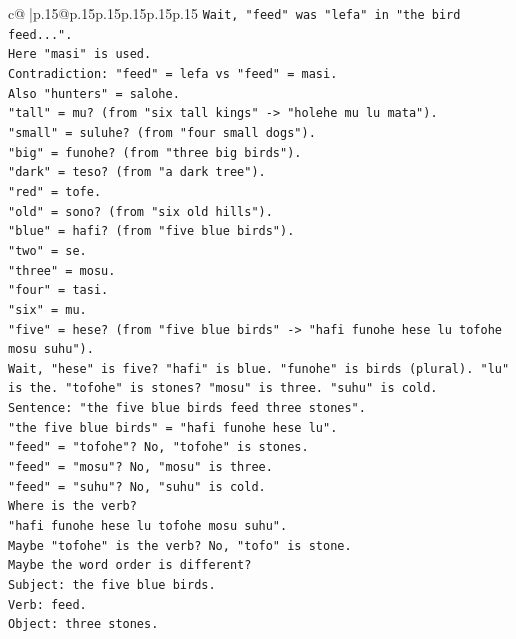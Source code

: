 \documentclass{article}
\begin{document}
{\begin{supertabular}{c@{$\;$}|p{.15\linewidth}@{}p{.15\linewidth}p{.15\linewidth}p{.15\linewidth}p{.15\linewidth}p{.15\linewidth}}
{{{\texttt{Wait, "feed" was "lefa" in "the bird feed...".} \\
\texttt{Here "masi" is used.} \\
\texttt{Contradiction: "feed" = lefa vs "feed" = masi.} \\
\texttt{Also "hunters" = salohe.} \\
\texttt{"tall" = mu? (from "six tall kings" {-}> "holehe mu lu mata").} \\
\texttt{"small" = suluhe? (from "four small dogs").} \\
\texttt{"big" = funohe? (from "three big birds").} \\
\texttt{"dark" = teso? (from "a dark tree").} \\
\texttt{"red" = tofe.} \\
\texttt{"old" = sono? (from "six old hills").} \\
\texttt{"blue" = hafi? (from "five blue birds").} \\
\texttt{"two" = se.} \\
\texttt{"three" = mosu.} \\
\texttt{"four" = tasi.} \\
\texttt{"six" = mu.} \\
\texttt{"five" = hese? (from "five blue birds" {-}> "hafi funohe hese lu tofohe mosu suhu").} \\
\texttt{Wait, "hese" is five? "hafi" is blue. "funohe" is birds (plural). "lu" is the. "tofohe" is stones? "mosu" is three. "suhu" is cold.} \\
\texttt{Sentence: "the five blue birds feed three stones".} \\
\texttt{"the five blue birds" = "hafi funohe hese lu".} \\
\texttt{"feed" = "tofohe"? No, "tofohe" is stones.} \\
\texttt{"feed" = "mosu"? No, "mosu" is three.} \\
\texttt{"feed" = "suhu"? No, "suhu" is cold.} \\
\texttt{Where is the verb?} \\
\texttt{"hafi funohe hese lu tofohe mosu suhu".} \\
\texttt{Maybe "tofohe" is the verb? No, "tofo" is stone.} \\
\texttt{Maybe the word order is different?} \\
\texttt{Subject: the five blue birds.} \\
\texttt{Verb: feed.} \\
\texttt{Object: three stones.} \\
}}}
\end{supertabular}}
\end{document}
